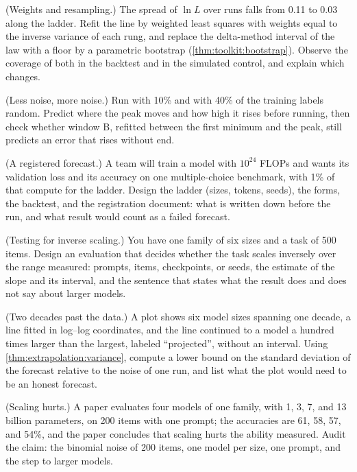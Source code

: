 \begin{refsection}
\begin{exercises}
\item \labwork (Weights and resampling.) The spread of $\ln L$ over runs falls from 0.11 to 0.03 along the ladder. Refit the line by weighted least squares with weights equal to the inverse variance of each rung, and replace the delta-method interval of the law with a floor by a parametric bootstrap (\cref{thm:toolkit:bootstrap}). Observe the coverage of both in the backtest and in the simulated control, and explain which changes.\label{ex:extrapolation:weights}

\item \labwork (Less noise, more noise.) Run  with 10\% and with 40\% of the training labels random. Predict where the peak moves and how high it rises before running, then check whether window B, refitted between the first minimum and the peak, still predicts an error that rises without end.\label{ex:extrapolation:noise}

\item \design (A registered forecast.) A team will train a model with $10^{24}$ FLOPs and wants its validation loss and its accuracy on one multiple-choice benchmark, with 1\% of that compute for the ladder. Design the ladder (sizes, tokens, seeds), the forms, the backtest, and the registration document: what is written down before the run, and what result would count as a failed forecast.\label{ex:extrapolation:register}

\item \design (Testing for inverse scaling.) You have one family of six sizes and a task of 500 items. Design an evaluation that decides whether the task scales inversely over the range measured: prompts, items, checkpoints, or seeds, the estimate of the slope and its interval, and the sentence that states what the result does and does not say about larger models.\label{ex:extrapolation:inverse}

\item \critique (Two decades past the data.) A plot shows six model sizes spanning one decade, a line fitted in log--log coordinates, and the line continued to a model a hundred times larger than the largest, labeled ``projected'', without an interval. Using \cref{thm:extrapolation:variance}, compute a lower bound on the standard deviation of the forecast relative to the noise of one run, and list what the plot would need to be an honest forecast.\label{ex:extrapolation:critique1}

\item \critique (Scaling hurts.) A paper evaluates four models of one family, with 1, 3, 7, and 13 billion parameters, on 200 items with one prompt; the accuracies are 61, 58, 57, and 54\%, and the paper concludes that scaling hurts the ability measured. Audit the claim: the binomial noise of 200 items, one model per size, one prompt, and the step to larger models.\label{ex:extrapolation:critique2}


\end{exercises}
\end{refsection}

